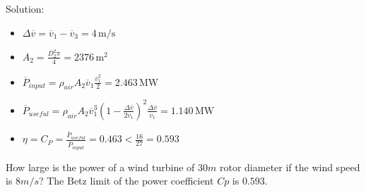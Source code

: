 \noindent Solution:

\begin{itemize}
\item $\Delta \overline{v}=\overline{v}_1-\overline{v}_3=4\,\mathrm{m/s}$
\item $A_2=\frac{D_2^2\pi}{4}=2376\,\mathrm{m^2}$
\item $\overline{P}_{input}=\rho_{air}A_2\overline{v}_1\frac{\overline{v}_1^2}{2}=2.463\,\mathrm{MW}$
\item $\overline{P}_{useful}=\rho_{air}A_2\overline{v}_1^3\left(1-\frac{\Delta \overline{v}}{2v_1}\right)^2\frac{\Delta \overline{v}}{v_1}=1.140\,\mathrm{MW}$
\item $\eta=C_P=\frac{\overline{P}_{useful}}{\overline{P}_{input}}=0.463<\frac{16}{27}=0.593$
\end{itemize}


\vspace{1cm}

How large is the power of a wind turbine of $30 m$ rotor diameter if the wind speed is $8 m/s$? The Betz limit of the power coefficient $Cp$ is $0.593$.
